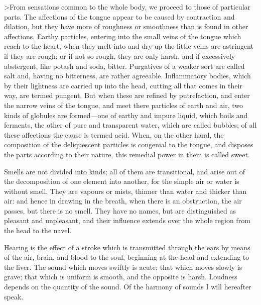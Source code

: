 \documentclass[11pt,letter]{article}
\begin{document}
\par  >From sensations common to the whole body, we proceed to those of particular parts. The affections of the tongue appear to be caused by contraction and dilation, but they have more of roughness or smoothness than is found in other affections. Earthy particles, entering into the small veins of the tongue which reach to the heart, when they melt into and dry up the little veins are astringent if they are rough; or if not so rough, they are only harsh, and if excessively abstergent, like potash and soda, bitter. Purgatives of a weaker sort are called salt and, having no bitterness, are rather agreeable. Inflammatory bodies, which by their lightness are carried up into the head, cutting all that comes in their way, are termed pungent. But when these are refined by putrefaction, and enter the narrow veins of the tongue, and meet there particles of earth and air, two kinds of globules are formed—one of earthy and impure liquid, which boils and ferments, the other of pure and transparent water, which are called bubbles; of all these affections the cause is termed acid. When, on the other hand, the composition of the deliquescent particles is congenial to the tongue, and disposes the parts according to their nature, this remedial power in them is called sweet.

\par  Smells are not divided into kinds; all of them are transitional, and arise out of the decomposition of one element into another, for the simple air or water is without smell. They are vapours or mists, thinner than water and thicker than air: and hence in drawing in the breath, when there is an obstruction, the air passes, but there is no smell. They have no names, but are distinguished as pleasant and unpleasant, and their influence extends over the whole region from the head to the navel.

\par  Hearing is the effect of a stroke which is transmitted through the ears by means of the air, brain, and blood to the soul, beginning at the head and extending to the liver. The sound which moves swiftly is acute; that which moves slowly is grave; that which is uniform is smooth, and the opposite is harsh. Loudness depends on the quantity of the sound. Of the harmony of sounds I will hereafter speak.
\end{document}
